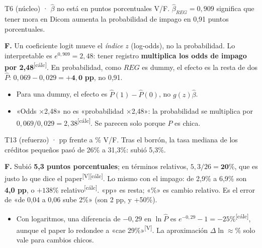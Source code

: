 \documentclass[10pt,a4paper]{article}
\newcommand{\V}{\textsuperscript{\textcolor{green!45!black}{[V]}}}
\newcommand{\calc}{\textsuperscript{\textcolor{blue!60!black}{[cálc]}}}
\newcommand{\Ph}{\hat P}
\begin{document}
\begin{enun}{T6 (núcleo) · $\hat\beta$ no está en puntos porcentuales}
V/F. $\hat\beta_{REG}=0{,}909$ significa que tener mora en Dicom aumenta la probabilidad de impago en 0,91 puntos porcentuales.
\end{enun}
\begin{ejemplar}
\textbf{F.} Un coeficiente logit mueve el \emph{índice} $z$ (log-odds), no la probabilidad. Lo interpretable es $e^{0,909}=2{,}48$: tener registro \textbf{multiplica los odds de impago por 2,48}\calc. En probabilidad, como $REG$ es dummy, el efecto es la resta de dos $\Ph$: $0{,}069-0{,}029=\mathbf{+4{,}0}$ \textbf{pp}, no 0,91.
\end{ejemplar}
\begin{trampa}
\begin{itemize}[leftmargin=*,itemsep=0pt,topsep=0pt]
\item Para una dummy, el efecto es $\Ph(1)-\Ph(0)$, no $g(z)\hat\beta$.
\item «Odds ×2,48» no es «probabilidad ×2,48»: la probabilidad se multiplica por $0{,}069/0{,}029=2{,}38$\calc. Se parecen solo porque $P$ es chica.
\end{itemize}
\end{trampa}

\begin{enun}{T13 (refuerzo) · pp frente a \%}
V/F. Tras el borrón, la tasa mediana de los créditos pequeños pasó de 26\% a 31,3\%: subió 5,3\%.
\end{enun}
\begin{ejemplar}
\textbf{F.} Subió \textbf{5,3 puntos porcentuales}; en términos relativos, $5{,}3/26=\mathbf{20\%}$, que es justo lo que dice el paper\V\calc. Lo mismo con el impago: de 2,9\% a 6,9\% son \textbf{4,0 pp}, o $+138\%$ relativo\calc. «pp» es resta; «\%» es cambio relativo. Es el error de «de 0,04 a 0,06 sube 2\%» (son 2 pp, y +50\%).
\end{ejemplar}
\begin{trampa}
\begin{itemize}[leftmargin=*,itemsep=0pt,topsep=0pt]
\item Con logaritmos, una diferencia de $-0{,}29$ en $\ln \Ph$ es $e^{-0,29}-1=-25\%$\calc, aunque el paper lo redondee a «cae 29\%»\V. La aproximación $\Delta\ln\approx\%$ solo vale para cambios chicos.
\end{itemize}
\end{trampa}
\end{document}
